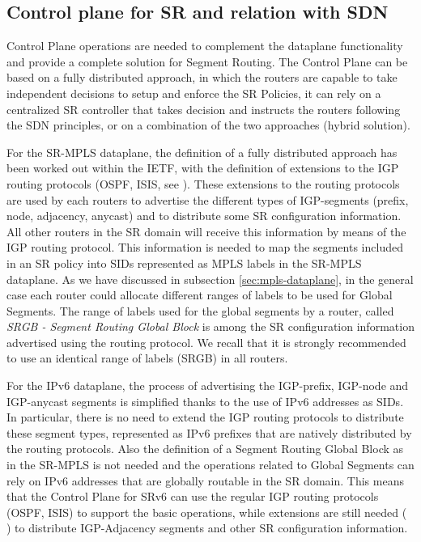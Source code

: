 

\subsection{Control plane for SR and relation with SDN}
\label{sec:sr_control_plane}

Control Plane operations are needed to complement the dataplane functionality and provide a complete solution for Segment Routing. The Control Plane can be based on a fully distributed approach, in which the routers are capable to take independent decisions to setup and enforce the SR Policies, it can rely on a centralized SR controller that takes decision and instructs the routers following the SDN principles, or on a combination of the two approaches (hybrid solution). 

For the SR-MPLS dataplane, the definition of a fully distributed approach has been worked out within the IETF, with the definition of extensions to the IGP routing protocols (OSPF, ISIS, see \cite{ietf-ospf-segment-routing-extensions} \cite{ietf-ospf-ospfv3-segment-routing-extensions} \cite{ietf-isis-segment-routing-extensions}). 
These extensions to the routing protocols are used by each routers to advertise the different types of IGP-segments (prefix, node, adjacency, anycast) and to distribute some SR configuration information. All other routers in the SR domain will receive this information by means of the IGP routing protocol. This information is needed to map the segments included in an SR policy into SIDs represented as MPLS labels in the SR-MPLS dataplane. As we have discussed in subsection \ref{sec:mpls-dataplane}, in the general case each router could allocate different ranges of labels to be used for Global Segments. The range of labels used for the global segments by a router, called \textit{SRGB - Segment Routing Global Block} is among the SR configuration information advertised using the routing protocol. We recall that it is strongly recommended to use an identical range of labels (SRGB) in all routers. 

For the IPv6 dataplane, the process of advertising the IGP-prefix, IGP-node and IGP-anycast segments is simplified thanks to the use of IPv6 addresses as SIDs. In particular, there is no need to extend the IGP routing protocols to distribute these segment types, represented as IPv6 prefixes that are natively distributed by the routing protocols. Also the definition of a Segment Routing Global Block as in the SR-MPLS is not needed and the operations related to Global Segments can rely on IPv6 addresses that are globally routable in the SR domain. This means that the Control Plane for SRv6 can use the regular IGP routing protocols (OSPF, ISIS) to support the basic operations, while extensions are still needed (\cite{id-isis-srv6-extensions} \cite{li-ospf-ospfv3-srv6-extensions}) to distribute IGP-Adjacency segments and other SR configuration information. 

